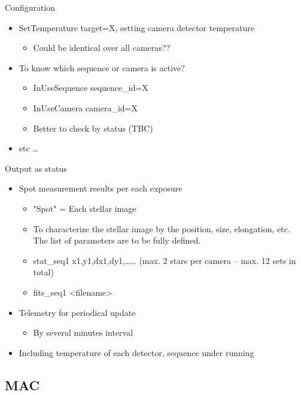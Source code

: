 \documentclass[a4paper,notitlepage]{article}
\begin{document}
Configuration
\begin{itemize}
  \item SetTemperature target=X, setting camera detector temperature
  \begin{itemize}
    \item Could be identical over all cameras??
  \end{itemize}
  \item To know which sequence or camera is active?
  \begin{itemize}
    \item InUseSequence sequence\_id=X
    \item InUseCamera camera\_id=X
    \item Better to check by status (TBC)
  \end{itemize}
  \item etc …
\end{itemize}

Output as status
\begin{itemize}
  \item Spot measurement results per each exposure
  \begin{itemize}
    \item "Spot" = Each stellar image
    \item To characterize the stellar image by the position, size, elongation, etc. The list of parameters are to be fully defined.
    \item stat\_seq1 x1,y1,dx1,dy1,…… (max. 2 stars per camera -- max. 12 sets in total)
    \item fits\_seq1 <filename>
  \end{itemize}
  \item Telemetry for periodical update
  \begin{itemize}
    \item By several minutes interval
  \end{itemize}
  \item Including temperature of each detector, sequence under running
\end{itemize}


\subsection{MAC}
\end{document}
